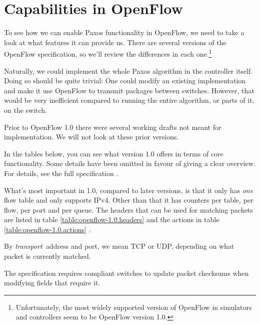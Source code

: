\section{Capabilities in OpenFlow}
\label{chapter:details.openflow}


To see how we can enable Paxos functionality in OpenFlow, we need to take a
look at what features it can provide us.  There are several versions of the
OpenFlow specification, so we'll review the differences in each
one.\footnote{Unfortunately, the most widely supported version of OpenFlow in
simulators and controllers seem to be OpenFlow version 1.0.}

Naturally, we could implement the whole Paxos algorithm in the controller
itself.  Doing so should be quite trivial: One could modify an existing
implementation and make it use OpenFlow to transmit packages between
switches.  However, that would be very inefficient compared to running the
entire algorithm, or parts of it, on the switch.

Prior to OpenFlow 1.0 \cite{openflow-1.0} there were several working
drafts not meant for implementation.  We will not look at these prior
versions.

In the tables below, you can see what version 1.0 offers in terms of core
functionality.  Some details have been omitted in favour of giving a clear
overview.  For details, see the full specification \cite{openflow-1.0}.

What's most important in 1.0, compared to later versions, is that it only
has \textit{one} flow table and only supports IPv4.  Other than that it has
counters per table, per flow, per port and per queue.  The headers that can
be used for matching packets are listed in table
\ref{table:openflow-1.0.headers}  and
the actions in table \ref{table:openflow-1.0.actions}
.

By \textit{transport} address and port, we mean \acs{TCP} or \acs{UDP},
depending on what packet is currently matched.

The specification requires compliant switches to update packet checksums
when modifying fields that require it.

